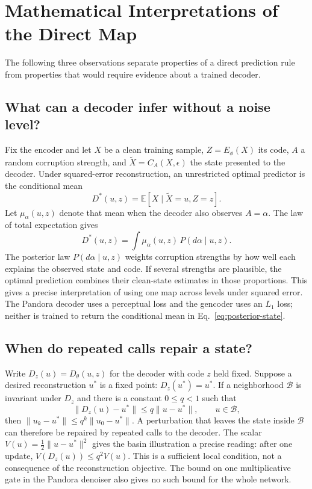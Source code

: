 \section{Mathematical Interpretations of the Direct Map}
\label{sec:geometry-notes}

The following three observations separate properties of a direct prediction rule from properties that would require evidence about a trained decoder.

\subsection{What can a decoder infer without a noise level?}

Fix the encoder and let $X$ be a clean training sample, $Z=E_\phi(X)$ its code, $A$ a random corruption strength, and $\widetilde{X}=C_A(X,\epsilon)$ the state presented to the decoder. Under squared-error reconstruction, an unrestricted optimal predictor is the conditional mean
\begin{equation}
  D^*(u,z)=\mathbb{E}[X\mid\widetilde{X}=u,Z=z].
  \label{eq:posterior-state}
\end{equation}
Let $\mu_\alpha(u,z)$ denote that mean when the decoder also observes $A=\alpha$. The law of total expectation gives
\begin{equation}
  D^*(u,z)=\int \mu_\alpha(u,z)\,
  P(d\alpha\mid u,z).
  \label{eq:latent-noise-level}
\end{equation}
The posterior law $P(d\alpha\mid u,z)$ weights corruption strengths by how well each explains the observed state and code. If several strengths are plausible, the optimal prediction combines their clean-state estimates in those proportions. This gives a precise interpretation of using one map across levels under squared error. The Pandora decoder uses a perceptual loss and the gencoder uses an $L_1$ loss; neither is trained to return the conditional mean in Eq.~\eqref{eq:posterior-state}.

\subsection{When do repeated calls repair a state?}

Write $D_z(u)=D_\theta(u,z)$ for the decoder with code $z$ held fixed. Suppose a desired reconstruction $u^*$ is a fixed point: $D_z(u^*)=u^*$. If a neighborhood $\mathcal{B}$ is invariant under $D_z$ and there is a constant $0\leq q<1$ such that
\begin{equation}
  \|D_z(u)-u^*\|\leq q\|u-u^*\|,
  \qquad u\in\mathcal{B},
  \label{eq:repair-contraction}
\end{equation}
then $\|u_k-u^*\|\leq q^k\|u_0-u^*\|$. A perturbation that leaves the state inside $\mathcal{B}$ can therefore be repaired by repeated calls to the decoder. The scalar $V(u)=\tfrac12\|u-u^*\|^2$ gives the basin illustration a precise reading: after one update, $V(D_z(u))\leq q^2 V(u)$. This is a sufficient local condition, not a consequence of the reconstruction objective. The bound on one multiplicative gate in the Pandora denoiser also gives no such bound for the whole network.

